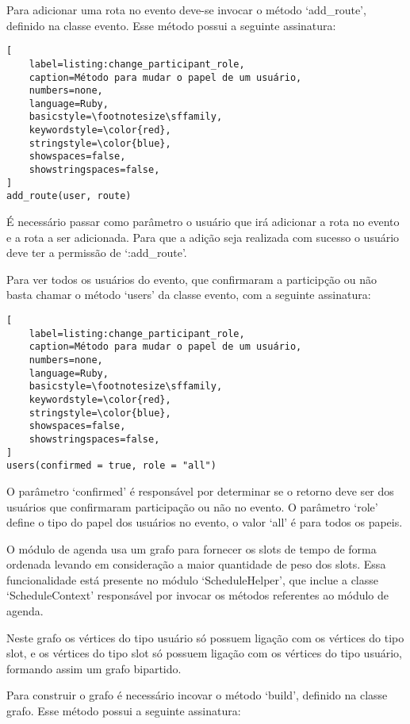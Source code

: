 Para adicionar uma rota no evento deve-se invocar o método `add\_route', definido na classe evento. Esse método possui a seguinte assinatura:

\begin{lstlisting}[
    label=listing:change_participant_role,
    caption=Método para mudar o papel de um usuário,
    numbers=none,
    language=Ruby,
    basicstyle=\footnotesize\sffamily,
    keywordstyle=\color{red},
    stringstyle=\color{blue},
    showspaces=false,
    showstringspaces=false,
]
add_route(user, route)
\end{lstlisting}

É necessário passar como parâmetro o usuário que irá adicionar a rota no evento e a rota a ser adicionada. Para que a adição seja realizada com sucesso o usuário deve ter a permissão de `:add\_route'.

Para ver todos os usuários do evento, que confirmaram a participção ou não basta chamar o método `users' da classe evento, com a seguinte assinatura:

\begin{lstlisting}[
    label=listing:change_participant_role,
    caption=Método para mudar o papel de um usuário,
    numbers=none,
    language=Ruby,
    basicstyle=\footnotesize\sffamily,
    keywordstyle=\color{red},
    stringstyle=\color{blue},
    showspaces=false,
    showstringspaces=false,
]
users(confirmed = true, role = "all")
\end{lstlisting}

O parâmetro `confirmed' é responsável por determinar se o retorno deve ser dos usuários que confirmaram participação ou não no evento. O parâmetro `role' define o tipo do papel dos usuários no evento, o valor `all' é para todos os papeis.

O módulo de agenda usa um grafo para fornecer os slots de tempo de forma ordenada levando em consideração a maior quantidade de peso dos slots. Essa funcionalidade está presente no módulo `ScheduleHelper', que inclue a classe `ScheduleContext' responsável por invocar os métodos referentes ao módulo de agenda.

Neste grafo os vértices do tipo usuário só possuem ligação com os vértices do tipo slot, e os vértices do tipo slot só possuem ligação com os vértices do tipo usuário, formando assim um grafo bipartido.

Para construir o grafo é necessário incovar o método `build', definido na classe grafo. Esse método possui a seguinte assinatura:


